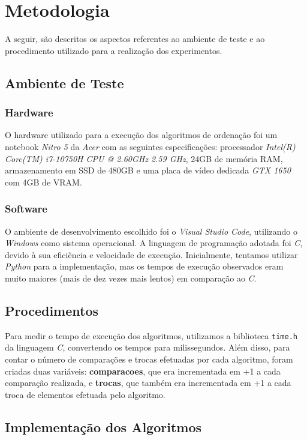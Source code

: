 \documentclass[a4paper,12pt]{article}
\begin{document}
\section{Metodologia}

A seguir, são descritos os aspectos referentes ao ambiente de teste e ao procedimento utilizado para a realização dos experimentos.

\subsection{Ambiente de Teste}

\subsubsection{Hardware}
O hardware utilizado para a execução dos algoritmos de ordenação foi um notebook \textit{Nitro 5} da \textit{Acer} com as seguintes especificações: processador \textit{Intel(R) Core(TM) i7-10750H CPU @ 2.60GHz 2.59 GHz}, 24GB de memória RAM, armazenamento em SSD de 480GB e uma placa de vídeo dedicada \textit{GTX 1650} com 4GB de VRAM.

\subsubsection{Software}
O ambiente de desenvolvimento escolhido foi o \textit{Visual Studio Code}, utilizando o \textit{Windows} como sistema operacional. A linguagem de programação adotada foi \textit{C}, devido à sua eficiência e velocidade de execução. Inicialmente, tentamos utilizar \textit{Python} para a implementação, mas os tempos de execução observados eram muito maiores (mais de dez vezes mais lentos) em comparação ao \textit{C}.

\subsection{Procedimentos}

Para medir o tempo de execução dos algoritmos, utilizamos a biblioteca \texttt{time.h} da linguagem \textit{C}, convertendo os tempos para milissegundos. Além disso, para contar o número de comparações e trocas efetuadas por cada algoritmo, foram criadas duas variáveis: \textbf{comparacoes}, que era incrementada em +1 a cada comparação realizada, e \textbf{trocas}, que também era incrementada em +1 a cada troca de elementos efetuada pelo algoritmo.


\subsection{Implementação dos Algoritmos}
\end{document}
